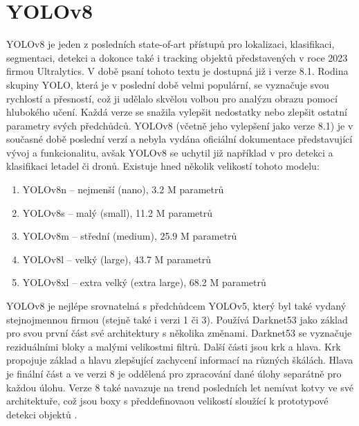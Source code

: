 \section{YOLOv8}
\label{sec:Chapter26}
YOLOv8 je jeden z posledních state-of-art přístupů pro lokalizaci, klasifikaci, segmentaci, detekci a dokonce také i tracking objektů představených v roce 2023 firmou Ultralytics. V době psaní tohoto textu je dostupná již i verze 8.1. Rodina skupiny YOLO, která je v poslední době velmi populární, se vyznačuje svou rychlostí a přesností, což ji udělalo skvělou volbou pro analýzu obrazu pomocí hlubokého učení. Každá verze se snažila vylepšit nedostatky nebo zlepšit ostatní parametry svých předchůdců. YOLOv8 (včetně jeho vylepšení jako verze 8.1) je v současné době poslední verzí a nebyla vydána oficiální dokumentace představující vývoj a funkcionalitu, avšak YOLOv8 se uchytil již například v \cite{yoloplane} pro detekci a klasifikaci letadel či dronů. Existuje hned několik velikostí tohoto modelu:
\begin{enumerate}
  \item YOLOv8n -- nejmenší (nano), 3.2 M parametrů
  \item YOLOv8s -- malý (small), 11.2 M parametrů
  \item YOLOv8m -- střední (medium), 25.9 M parametrů
  \item YOLOv8l -- velký (large), 43.7 M parametrů
  \item YOLOv8xl -- extra velký (extra large), 68.2 M parametrů
\end{enumerate}

YOLOv8 je nejlépe srovnatelná s předchůdcem YOLOv5, který byl také vydaný stejnojmennou firmou (stejně také i verzi 1 či 3). Používá Darknet53 \cite{darknet} jako základ pro svou první část své architektury s několika změnami. Darknet53 se vyznačuje reziduálními bloky a malými velikostmi filtrů. Další části jsou krk a hlava. Krk propojuje základ a hlavu zlepšující zachycení informací na různých škálách. Hlava je finální část a ve verzi 8 je oddělená pro zpracování dané úlohy separátně pro každou úlohu. Verze 8 také navazuje na trend posledních let nemívat kotvy ve své architektuře, což jsou boxy s předdefinovaou velikostí sloužící k prototypové detekci objektů \cite{yolo_comparison}.


\endinput
